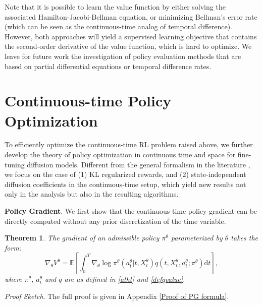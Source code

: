 \documentclass{article}
\theoremstyle{plain}
\newtheorem{theorem}{Theorem}[section]
\theoremstyle{definition}
\theoremstyle{remark}
\begin{document}
Note that it is possible to learn the value function by either solving the associated Hamilton-Jacobi-Bellman equation, or minimizing Bellman's error rate (which can be seen as the continuous-time analog of temporal difference). However, both approaches will yield a supervised learning objective that contains the second-order derivative of the value function, 
which is hard to optimize. We leave for future work the investigation of policy evaluation methods that are based on partial differential equations or temporal difference rates.

\section{Continuous-time Policy Optimization}
\label{sc4}

To efficiently optimize the continuous-time RL problem raised above, 
we further develop the theory of policy optimization in continuous time and space for fine-tuning diffusion models. 
Different from the general formalism in the literature \cite{schulman2015trust,zhao2024policy},
we focus on the case of 
(1) KL regularized rewards,
and (2) state-independent diffusion coefficients in the continuous-time setup, which yield new results not only in the analysis but also in the resulting algorithms.

\textbf{Policy Gradient}. We first show that the continuous-time policy gradient can be directly computed 
without any prior discretization of the time variable.
\begin{theorem}
\label{thm:PG formula}
The gradient of an admissible policy $\pi^{\theta}$ parameterized by $\theta$ takes the form:
\begin{equation}
\nabla_{\theta} V^{\theta}= \mathbb{E}\left[\int _ { 0 } ^ { T }\nabla_{\theta} \log \pi^ { \theta} ( a _ { t } ^ {\theta} | t , X _ { t } ^ {\theta} ) q(t, X_t^{\theta}, a_t^{\theta} ; \pi^\theta)\mathrm{d} t\right],
\end{equation}
where $\pi^\theta$, $a^\theta_t$ and $q$ are as defined in \eqref{atht} and \eqref{defqvalue}.
\end{theorem}

{\it Proof Sketch}. The full proof is given in Appendix \ref{Proof of PG formula}. 
\end{document}
